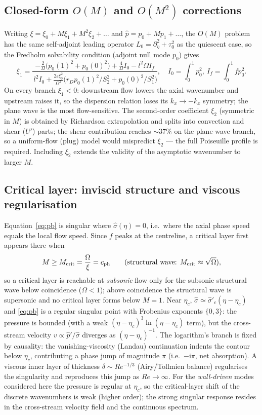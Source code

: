 \documentclass[11pt]{article}
\newcommand{\Om}{\Omega}
\newcommand{\eps}{\varepsilon}
\begin{document}
\subsection{Closed-form $O(M)$ and $O(M^2)$ corrections}
Writing $\xi=\xi_0+M\xi_1+M^2\xi_2+\dots$ and $\hat p=p_0+Mp_1+\dots$, the $O(M)$ problem has the same
self-adjoint leading operator $L_0=\partial_\eta^2+\tau_0^2$ as the quiescent case, so the Fredholm
solvability condition (adjoint null mode $p_0$) gives
\begin{equation}
\xi_1=\frac{-\tfrac{2}{\Om}\big(p_0(1)^2+p_0(0)^2\big)+\tfrac{4}{\Om}I_0-l^2\Om I_f}
{\,l^2I_0+\tfrac{2\eps\xi_0^2}{\Om^2}\big(r_Dp_0(1)^2/S_2^2+p_0(0)^2/S_1^2\big)},
\quad I_0\!=\!\!\int_0^1\!\!p_0^2,\ I_f\!=\!\!\int_0^1\!\!f p_0^2 .
\label{eq:xi1}
\end{equation}
On every branch $\xi_1<0$: downstream flow lowers the axial wavenumber and upstream raises it, so the
dispersion relation loses its $k_x\to-k_x$ symmetry; the plane wave is the most flow-sensitive. The
second-order coefficient $\xi_2$ (symmetric in $M$) is obtained by Richardson extrapolation and splits
into convection and shear ($U'$) parts; the shear contribution reaches $\sim37\%$ on the plane-wave
branch, so a uniform-flow (plug) model would mispredict $\xi_2$ --- the full Poiseuille profile is
required. Including $\xi_2$ extends the validity of the asymptotic wavenumber to larger $M$.

\subsection{Critical layer: inviscid structure and viscous regularisation}
Equation~\eqref{eq:pb} is singular where $\hat\sigma(\eta)=0$, i.e.\ where the axial phase speed equals
the local flow speed. Since $f$ peaks at the centreline, a critical layer first appears there when
\begin{equation}
M\ge M_{\rm crit}=\frac{\Om}{\xi}=c_{\rm ph}\qquad(\text{structural wave: } M_{\rm crit}\approx\sqrt{\Om}),
\end{equation}
so a critical layer is reachable at \emph{subsonic} flow only for the subsonic structural wave below
coincidence ($\Om<1$); above coincidence the structural wave is supersonic and no critical layer forms
below $M=1$. Near $\eta_c$, $\hat\sigma\simeq\hat\sigma'_c(\eta-\eta_c)$ and \eqref{eq:pb} is a regular
singular point with Frobenius exponents $\{0,3\}$: the pressure is bounded (with a weak
$(\eta-\eta_c)^3\ln(\eta-\eta_c)$ term), but the cross-stream velocity $v\propto\hat p'/\hat\sigma$
diverges as $(\eta-\eta_c)^{-1}$. The logarithm's branch is fixed by causality: the vanishing-viscosity
(Landau) continuation indents the contour below $\eta_c$, contributing a phase jump of magnitude $\pi$
(i.e.\ $-\mathrm{i}\pi$, net absorption). A viscous inner layer of thickness $\delta\sim Re^{-1/3}$
(Airy/Tollmien balance) regularises the singularity and reproduces this jump as $Re\to\infty$. For the
\emph{wall-driven} modes considered here the pressure is regular at $\eta_c$, so the critical-layer
shift of the discrete wavenumbers is weak (higher order); the strong singular response resides in the
cross-stream velocity field and the continuous spectrum.
\end{document}
